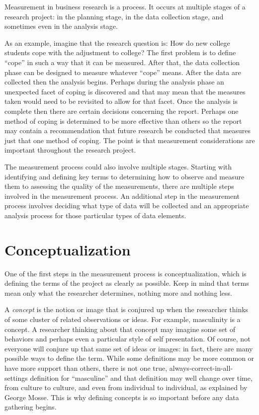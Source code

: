 Measurement in business research is a process. It occurs at multiple stages of a research project: in the planning stage, in the data collection stage, and sometimes even in the analysis stage. 

As an example, imagine that the research question is: How do new college students cope with the adjustment to college? The first problem is to define ``cope'' in such a way that it can be measured. After that, the data collection phase can be designed to measure whatever ``cope'' means. After the data are collected then the analysis begins. Perhaps during the analysis phase an unexpected facet of coping is discovered and that may mean that the measures taken would need to be revisited to allow for that facet. Once the analysis is complete then there are certain decisions concerning the report. Perhaps one method of coping is determined to be more effective than others so the report may contain a recommendation that future research be conducted that measures just that one method of coping. The point is that measurement considerations are important throughout the research project.

The measurement process could also involve multiple stages. Starting with identifying and defining key terms to determining how to observe and measure them to assessing the quality of the measurements, there are multiple steps involved in the measurement process. An additional step in the measurement process involves deciding what type of data will be collected and an appropriate analysis process for those particular types of data elements. 

\section{Conceptualization}

One of the first steps in the measurement process is conceptualization, which is defining the terms of the project as clearly as possible. Keep in mind that terms mean only what the researcher determines, nothing more and nothing less.

A \textit{concept} is the notion or image that is conjured up when the researcher thinks of some cluster of related observations or ideas. For example, masculinity is a concept. A researcher thinking about that concept may imagine some set of behaviors and perhaps even a particular style of self presentation. Of course, not everyone will conjure up that same set of ideas or images: in fact, there are many possible ways to define the term. While some definitions may be more common or have more support than others, there is not one true, always-correct-in-all-settings definition for ``masculine'' and that definition may well change over time, from culture to culture, and even from individual to individual, as explained by George Mosse\cite{george1996image}. This is why defining concepts is so important before any data gathering begins.

